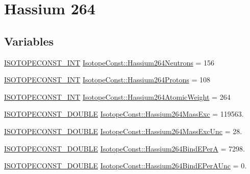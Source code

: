 \hypertarget{group___isotope_const-_hassium-_hs264}{}\section{Hassium 264}
\label{group___isotope_const-_hassium-_hs264}
\subsection*{Variables}
\begin{DoxyCompactItemize}
\item 
\mbox{\hyperlink{group___isotope_const-_macros_ga5f18360b3e99483a35c32d789e62621c}{I\+S\+O\+T\+O\+P\+E\+C\+O\+N\+S\+T\+\_\+\+I\+NT}} \mbox{\hyperlink{group___isotope_const-_hassium-_hs264_gac249d2a06ae22706ed45d634cddeb134}{Isotope\+Const\+::\+Hassium264\+Neutrons}} = 156
\item 
\mbox{\hyperlink{group___isotope_const-_macros_ga5f18360b3e99483a35c32d789e62621c}{I\+S\+O\+T\+O\+P\+E\+C\+O\+N\+S\+T\+\_\+\+I\+NT}} \mbox{\hyperlink{group___isotope_const-_hassium-_hs264_ga1f9dd1c7a167cf8e9c50739bee271709}{Isotope\+Const\+::\+Hassium264\+Protons}} = 108
\item 
\mbox{\hyperlink{group___isotope_const-_macros_ga5f18360b3e99483a35c32d789e62621c}{I\+S\+O\+T\+O\+P\+E\+C\+O\+N\+S\+T\+\_\+\+I\+NT}} \mbox{\hyperlink{group___isotope_const-_hassium-_hs264_gad739ce7ccdd1d90f866b6da18ab65366}{Isotope\+Const\+::\+Hassium264\+Atomic\+Weight}} = 264
\item 
\mbox{\hyperlink{group___isotope_const-_macros_ga8f45a7272ce02c0b4c65c44636ed719a}{I\+S\+O\+T\+O\+P\+E\+C\+O\+N\+S\+T\+\_\+\+D\+O\+U\+B\+LE}} \mbox{\hyperlink{group___isotope_const-_hassium-_hs264_gaf616c57a5d18a69c95008e94c839b61e}{Isotope\+Const\+::\+Hassium264\+Mass\+Exc}} = 119563.
\item 
\mbox{\hyperlink{group___isotope_const-_macros_ga8f45a7272ce02c0b4c65c44636ed719a}{I\+S\+O\+T\+O\+P\+E\+C\+O\+N\+S\+T\+\_\+\+D\+O\+U\+B\+LE}} \mbox{\hyperlink{group___isotope_const-_hassium-_hs264_ga8f2365fdb74a58716625129fc9b1152c}{Isotope\+Const\+::\+Hassium264\+Mass\+Exc\+Unc}} = 28.
\item 
\mbox{\hyperlink{group___isotope_const-_macros_ga8f45a7272ce02c0b4c65c44636ed719a}{I\+S\+O\+T\+O\+P\+E\+C\+O\+N\+S\+T\+\_\+\+D\+O\+U\+B\+LE}} \mbox{\hyperlink{group___isotope_const-_hassium-_hs264_ga2864a2673c44e2d28a93ead4a313ff30}{Isotope\+Const\+::\+Hassium264\+Bind\+E\+PerA}} = 7298.
\item 
\mbox{\hyperlink{group___isotope_const-_macros_ga8f45a7272ce02c0b4c65c44636ed719a}{I\+S\+O\+T\+O\+P\+E\+C\+O\+N\+S\+T\+\_\+\+D\+O\+U\+B\+LE}} \mbox{\hyperlink{group___isotope_const-_hassium-_hs264_ga9d9c63827ec61c8e67e0cff4f7320238}{Isotope\+Const\+::\+Hassium264\+Bind\+E\+Per\+A\+Unc}} = 0.

\end{DoxyCompactItemize}
